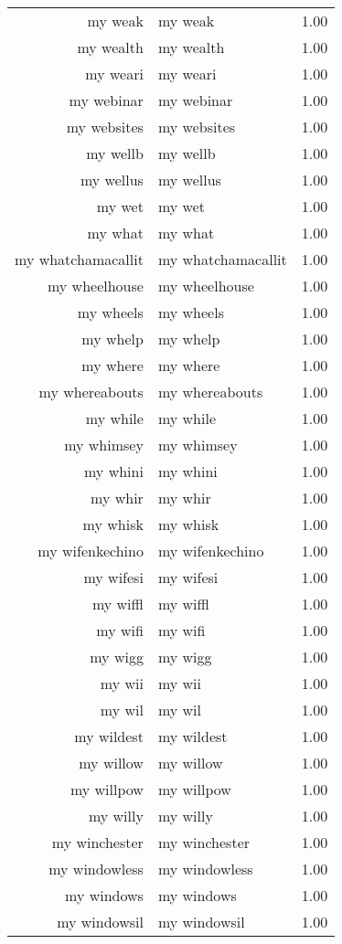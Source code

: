 \begin{table}[ht]
\begin{tabular}{rlr}
  my weak & my weak & 1.00 \\ 
  my wealth & my wealth & 1.00 \\ 
  my weari & my weari & 1.00 \\ 
  my webinar & my webinar & 1.00 \\ 
  my websites & my websites & 1.00 \\ 
  my wellb & my wellb & 1.00 \\ 
  my wellus & my wellus & 1.00 \\ 
  my wet & my wet & 1.00 \\ 
  my what & my what & 1.00 \\ 
  my whatchamacallit & my whatchamacallit & 1.00 \\ 
  my wheelhouse & my wheelhouse & 1.00 \\ 
  my wheels & my wheels & 1.00 \\ 
  my whelp & my whelp & 1.00 \\ 
  my where & my where & 1.00 \\ 
  my whereabouts & my whereabouts & 1.00 \\ 
  my while & my while & 1.00 \\ 
  my whimsey & my whimsey & 1.00 \\ 
  my whini & my whini & 1.00 \\ 
  my whir & my whir & 1.00 \\ 
  my whisk & my whisk & 1.00 \\ 
  my wifenkechino & my wifenkechino & 1.00 \\ 
  my wifesi & my wifesi & 1.00 \\ 
  my wiffl & my wiffl & 1.00 \\ 
  my wifi & my wifi & 1.00 \\ 
  my wigg & my wigg & 1.00 \\ 
  my wii & my wii & 1.00 \\ 
  my wil & my wil & 1.00 \\ 
  my wildest & my wildest & 1.00 \\ 
  my willow & my willow & 1.00 \\ 
  my willpow & my willpow & 1.00 \\ 
  my willy & my willy & 1.00 \\ 
  my winchester & my winchester & 1.00 \\ 
  my windowless & my windowless & 1.00 \\ 
  my windows & my windows & 1.00 \\ 
  my windowsil & my windowsil & 1.00 \\ 

\end{tabular}
\end{table}
